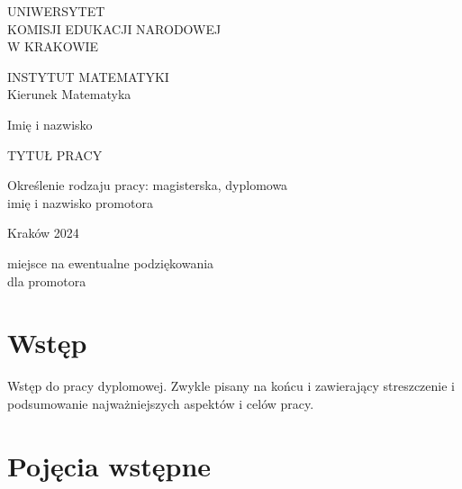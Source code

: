 \documentclass[12pt,oneside,a4paper]{book} %
\theoremstyle{break}
\begin{document}
\thispagestyle{empty}

\begin{center}{\sc \Large
UNIWERSYTET}\\[.2cm]
{\sc \Large KOMISJI EDUKACJI NARODOWEJ} \\[.2cm]
{\sc \Large W KRAKOWIE}
\par\vspace{1cm}\par
{\large 
INSTYTUT MATEMATYKI\\
Kierunek Matematyka\\
}
\end{center}
\vspace{5cm}
\begin{center}
{\large
Imię i nazwisko
}\par\vspace{0.5cm}\par
{\LARGE
TYTUŁ PRACY
}
\end{center}
\vspace{4cm}
\begin{flushright}
Określenie rodzaju pracy: magisterska, dyplomowa\\
imię i nazwisko promotora
\end{flushright}
\vfill
\begin{center}
Kraków 2024
\end{center}

\newpage

\vspace*{16cm}
\begin{flushright}
miejsce na ewentualne podziękowania\\
dla promotora
\end{flushright}



\thispagestyle{empty} \setcounter{page}{0} \tableofcontents

\chapter*{Wstęp}

\thispagestyle{empty} 

Wstęp do pracy dyplomowej. Zwykle pisany na końcu i zawierający streszczenie i podsumowanie najważniejszych aspektów i celów pracy.
\chapter{Pojęcia wstępne}
\thispagestyle{empty}
\end{document}
